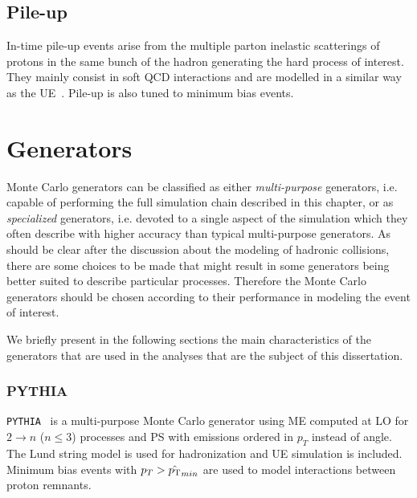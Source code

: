  


\subsection{Pile-up}\label{sec:MCpileup}

In-time pile-up events arise from the multiple parton inelastic scatterings 
of protons in the same bunch of the hadron generating the hard process
of interest. They mainly consist in soft QCD interactions and are
modelled in a similar way as the UE~\cite{Buckley:2011vq,Cacciari:2007fd}. 
Pile-up is also tuned to minimum bias events.





\section{Generators}\label{sec:generators}

Monte Carlo generators can be classified as either {\it multi-purpose} generators,
i.e. capable of performing the full simulation chain described in this chapter,
or as {\it specialized} generators, i.e. devoted to a single aspect of the
simulation which they often describe with higher accuracy than
typical multi-purpose generators. 
As should be clear after the discussion about the modeling
of hadronic collisions, there are some choices to be made that might result
in some generators 
being better suited 
to describe particular processes. Therefore
the Monte Carlo generators should be chosen according to their performance
in modeling the event of interest.

We briefly present in the following sections the main characteristics of the generators
that are used in the analyses that are the subject of this dissertation.


\subsubsection*{PYTHIA}

\texttt{PYTHIA}~\cite{PYTHIA,Sjostrand:2007gs} is a multi-purpose Monte Carlo generator
using ME computed at LO for $2 \to n$ ($n\leq 3$) processes and PS with emissions
ordered in $p_T$ instead of angle. The Lund string model is used for hadronization
and UE simulation is included.
Minimum bias events with $p_T>\hat{\pt}_{min}$ are used to model interactions
between proton remnants.


